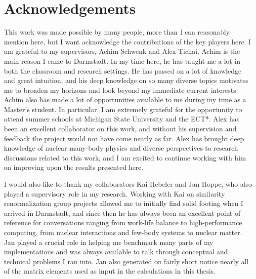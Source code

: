 \chapter*{Acknowledgements}

This work was made possible by many people,
more than I can reasonably mention here,
but I want acknowledge the contributions of the key players here.
I am grateful to my supervisors, Achim Schwenk and Alex Tichai.
Achim is the main reason I came to Darmstadt.
In my time here, he has taught me a lot
in both the classroom and research settings.
He has passed on a lot of knowledge and great intuition,
and his deep knowledge on so many diverse topics
motivates me to broaden my horizons and look beyond my immediate current interests.
Achim also has made a lot of opportunities available to me
during my time as a Master's student.
In particular, I am extremely grateful for the opportunity
to attend summer schools at Michigan State University
and the ECT*.
Alex has been an excellent collaborator on this work,
and without his supervision and feedback
the project would not have come nearly as far.
Alex has brought deep knowledge of nuclear many-body physics
and diverse perspectives to research discussions related to this work,
and I am excited to continue working with him on improving upon the results presented here.

I would also like to thank my collaborators Kai Hebeler and Jan Hoppe,
who also played a supervisory role in my research.
Working with Kai on similarity renormalization group projects
allowed me to initially find solid footing when I arrived in Darmstadt,
and since then he has always been an excellent point of reference
for conversations ranging from work-life balance to high-performance computing,
from nuclear interactions and few-body systems to nuclear matter.
Jan played a crucial role in helping me benchmark many parts of my implementations
and was always available to talk through conceptual and technical problems I ran into.
Jan also generated on fairly short notice nearly all of the matrix elements
used as input in the calculations in this thesis.

